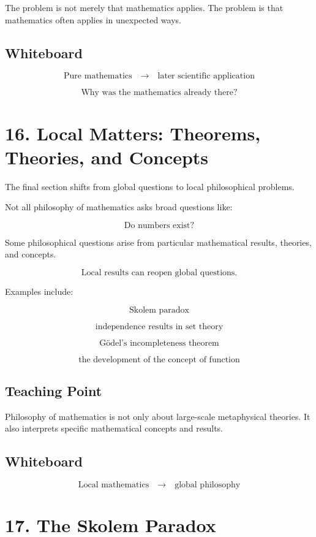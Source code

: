 \documentclass[11pt]{article}
\begin{document}
The problem is not merely that mathematics applies. The problem is that mathematics
often applies in unexpected ways.

\subsection*{Whiteboard}

\[
\text{Pure mathematics}
\quad \longrightarrow
\quad \text{later scientific application}
\]

\[
\text{Why was the mathematics already there?}
\]

\section*{16. Local Matters: Theorems, Theories, and Concepts}

The final section shifts from global questions to local philosophical problems.

Not all philosophy of mathematics asks broad questions like:

\[
\text{Do numbers exist?}
\]

Some philosophical questions arise from particular mathematical results, theories, and
concepts.

\[
\text{Local results can reopen global questions.}
\]

Examples include:

\[
\text{Skolem paradox}
\]

\[
\text{independence results in set theory}
\]

\[
\text{G\"odel's incompleteness theorem}
\]

\[
\text{the development of the concept of function}
\]

\subsection*{Teaching Point}

Philosophy of mathematics is not only about large-scale metaphysical theories. It also
interprets specific mathematical concepts and results.

\subsection*{Whiteboard}

\[
\text{Local mathematics}
\quad \longrightarrow
\quad \text{global philosophy}
\]

\section*{17. The Skolem Paradox}
\end{document}
